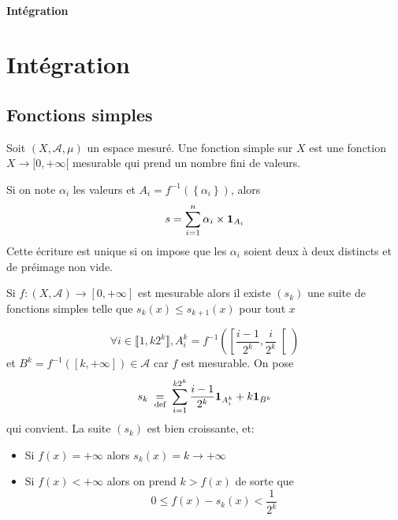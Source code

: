 \ifsolo
    ~

    \vspace{1cm}

    \begin{center}
        \textbf{\LARGE Intégration} \\[1em]
    \end{center}
    \tableofcontents
\else
    \chapter{Intégration}

    \minitoc
\fi
\thispagestyle{empty}

\section{Fonctions simples}

\begin{dfn}
    Soit $(X, \mathcal  A, \mu)$ un espace mesuré. Une fonction simple sur $X$ est une fonction  $X\longrightarrow [0, +\infty[$ mesurable qui prend un nombre fini de valeurs.
\end{dfn}

\begin{rem}
    Si on note $\alpha_i$ les valeurs et $A_i=f^{-1}(\left\{ \alpha_i \right\} )$, alors \[
        s=\sum_{i=1}^n \alpha_i \times \bm{1}_{A_i}
    \] 
    Cette écriture est unique si on impose que les $ \alpha_i$ soient deux à deux distincts et de préimage non vide.
\end{rem}

\begin{prop}
    Si $f:(X, \mathcal  A)\longrightarrow [0, +\infty]$ est mesurable alors il existe $(s_k)$ une suite de fonctions simples telle que  $s_k(x)\leq s_{k+1}(x)$ pour tout $x$
\end{prop}

\begin{prop}
\[
    \forall  i \in \llbracket 1, k2^k \rrbracket, A_i^k= f^{-1} \left( \left[ \frac{i-1}{2^k}, \frac{i}{2^k}  \right[ \right)
\] 
et $B^k=f^{-1}([k, +\infty]) \in  \mathcal  A$ car $f$ est mesurable. On pose \[
    s_k\;\underset{\text{def}}=\;\sum_{i=1}^{k2^k} \frac{i-1}{2^k} \bm{1}_{A_i^k}+k\bm{1}_{B^k}
\] 
qui convient. La suite $(s_k)$ est bien croissante, et:  \begin{itemize}
    \item Si $f(x)=+\infty$ alors  $s_k(x)=k \longrightarrow +\infty$
    \item Si $f(x)<+\infty$ alors on prend $k>f(x)$ de sorte que  \[
            0\leq f(x)-s_k(x)<\frac{1}{2^k}
    \] 
\end{itemize}
\end{prop}

